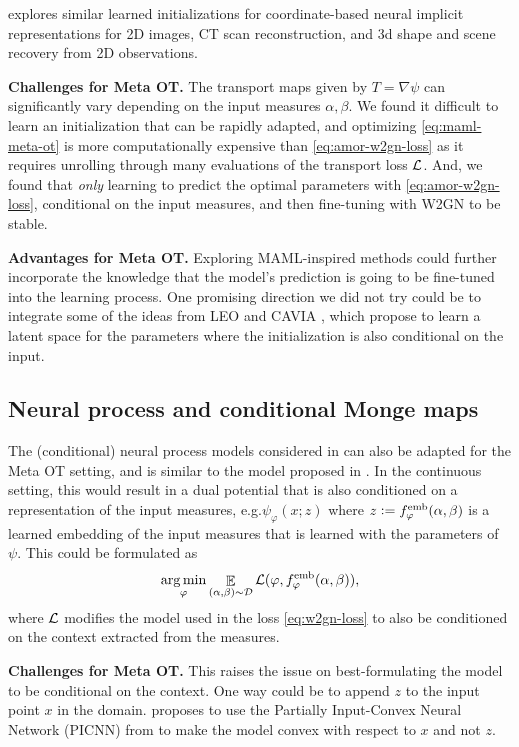 \documentclass{article}
\newcommand{\eg}{e.g.\xspace}
\newcommand{\defeq}{\vcentcolon=}
\begin{document}
\citet{tancik2021learned} explores similar learned initializations
for coordinate-based neural implicit representations for 2D images,
CT scan reconstruction, and 3d shape and scene recovery from 2D observations.

\textbf{Challenges for Meta OT.}
The transport maps given by $T=\nabla\psi$ can significantly
vary depending on the input measures $\alpha,\beta$.
We found it difficult to learn an initialization that can be rapidly
adapted, and optimizing \cref{eq:maml-meta-ot} is
more computationally expensive than
\cref{eq:amor-w2gn-loss} as it requires unrolling through many
evaluations of the transport loss ${\mathcal{L}}$.
And, we found that \emph{only} learning to predict the optimal
parameters with \cref{eq:amor-w2gn-loss}, conditional on the input measures,
and then fine-tuning with W2GN to be stable.

\textbf{Advantages for Meta OT.}
Exploring MAML-inspired methods could further incorporate the knowledge
that the model's prediction is going to be fine-tuned into the
learning process.
One promising direction we did not try could be to integrate
some of the ideas from
LEO \citep{rusu2018meta} and CAVIA \citep{zintgraf2019fast},
which propose to learn a latent space for the parameters
where the initialization is also conditional on the input.

\subsection{Neural process and conditional Monge maps}
The (conditional) neural process models considered in \citet{garnelo2018neural,garnelo2018conditional}
can also be adapted for the Meta OT setting, and is similar to the
model proposed in \citet{bunne2022supervised}.
In the continuous setting, this would result in a
dual potential that is also conditioned on a representation
of the input measures, \eg $\psi_\varphi(x; z)$ where
$z\defeq f^{\rm emb}_\varphi(\alpha, \beta)$ is a learned embedding
of the input measures that is learned with the parameters of $\psi$.
This could be formulated as
\begin{equation}
  \operatorname*{arg\,min}_\varphi \mathop{\mathbb{E}}_{(\alpha,\beta)\sim{\mathcal{D}}} {\mathcal{L}}(\varphi, f^{\rm emb}_\varphi(\alpha, \beta)),
  \label{eq:neural-process-meta-ot}
\end{equation}
where ${\mathcal{L}}$ modifies the model used in the loss \cref{eq:w2gn-loss} to
also be conditioned on the context extracted from the measures.

\textbf{Challenges for Meta OT.}
This raises the issue on best-formulating the model to be conditional
on the context. One way could be to append $z$ to the input
point $x$ in the domain.
\citet{bunne2022supervised} proposes to use the Partially Input-Convex
Neural Network (PICNN) from \citep{amos2017input} to make the model
convex with respect to $x$ and not $z$.
\end{document}
